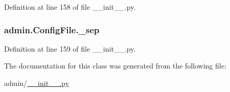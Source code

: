 Definition at line 158 of file \-\_\-\-\_\-init\-\_\-\-\_\-.\-py.

\hypertarget{classadmin_1_1ConfigFile_a3f7db562c59049e6a3b28b1fdfafa63e}{
\subsubsection[{\-\_\-sep}]{\setlength{\rightskip}{0pt plus 5cm}admin.\-Config\-File.\-\_\-sep\hspace{0.3cm}{\ttfamily [private]}}}\label{classadmin_1_1ConfigFile_a3f7db562c59049e6a3b28b1fdfafa63e}


Definition at line 159 of file \-\_\-\-\_\-init\-\_\-\-\_\-.\-py.



The documentation for this class was generated from the following file\-:\begin{DoxyCompactItemize}
\item 
admin/\hyperlink{____init_____8py}{\-\_\-\-\_\-init\-\_\-\-\_\-.\-py}\end{DoxyCompactItemize}
